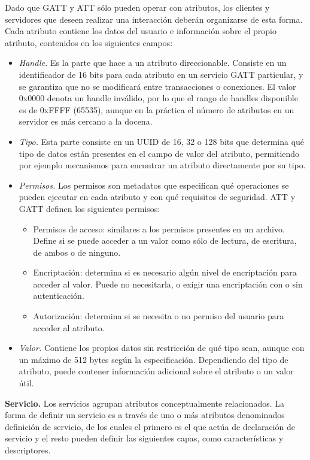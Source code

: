 Dado que GATT y ATT sólo pueden operar con atributos, los clientes y servidores que deseen realizar una interacción deberán organizarse de esta forma. Cada atributo contiene los datos del usuario e información sobre el propio atributo, contenidos en los siguientes campos:
\begin{itemize}
	\item \textit{Handle.} Es la parte que hace a un atributo direccionable. Consiste en un identificador de 16 bits para cada atributo en un servicio GATT particular, y se garantiza que no se modificará entre transacciones o conexiones.  El valor 0x0000 denota un handle inválido, por lo que el rango de handles disponible es de 0xFFFF (65535), aunque en la práctica el número de atributos en un servidor es más cercano a la docena.

	\item \textit{Tipo.} Esta parte consiste en un UUID de 16, 32 o 128 bits que determina qué tipo de datos están presentes en el campo de valor del atributo, permitiendo por ejemplo mecanismos para encontrar un atributo directamente por su tipo.

	\item \textit{Permisos.} Los permisos son metadatos que especifican qué operaciones se pueden ejecutar en cada atributo y con qué requisitos de seguridad. ATT y GATT definen los siguientes permisos:
	\begin{itemize}
		\item Permisos de acceso: similares a los permisos presentes en un archivo.  Define si se puede acceder a un valor como sólo de lectura, de escritura, de ambos o de ninguno.
		\item Encriptación: determina si es necesario algún nivel de encriptación para acceder al valor. Puede no necesitarla, o exigir una encriptación con o sin autenticación.
		\item Autorización: determina si se necesita o no permiso del usuario para acceder al atributo.
	\end{itemize}

	\item \textit{Valor.} Contiene los propios datos sin restricción de qué tipo sean, aunque con un máximo de 512 bytes según la especificación. Dependiendo del tipo de atributo, puede contener información adicional sobre el atributo o un valor útil.
\end{itemize}

\textbf{Servicio.} Los servicios agrupan atributos conceptualmente relacionados. La forma de definir un servicio es a través de uno o más atributos denominados definición de servicio, de los cuales el primero es el que actúa de declaración de servicio y el resto pueden definir las siguientes capas, como características y descriptores.

